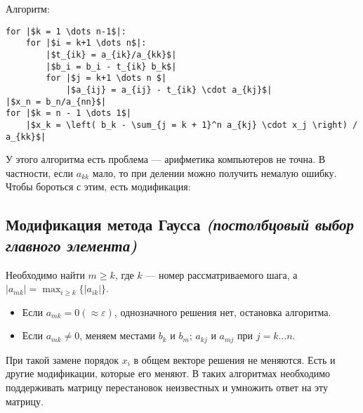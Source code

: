 Алгоритм:
\renewcommand{\theFancyVerbLine}{\sffamily \small\arabic{FancyVerbLine}}
\begin{verbatim}
for |$k = 1 \dots n-1$|:
    for |$i = k+1 \dots n$|:
        |$t_{ik} = a_{ik}/a_{kk}$|
        |$b_i = b_i - t_{ik} b_k$|
        for |$j = k+1 \dots n $|
            |$a_{ij} = a_{ij} - t_{ik} \cdot a_{kj}$|
|$x_n = b_n/a_{nn}$|
for |$k = n - 1 \dots 1$|
    |$x_k = \left( b_k - \sum_{j = k + 1}^n a_{kj} \cdot x_j \right) / a_{kk}$|
\end{verbatim}

У этого алгоритма есть проблема --- арифметика компьютеров не точна. В частности, если \(a_{kk}\) мало, то при делении можно получить немалую ошибку. Чтобы бороться с этим, есть модификация:

\subsection{Модификация метода Гаусса \textit{(постолбцовый выбор главного элемента)}}

Необходимо найти \(m \geq k\), где \(k\) --- номер рассматриваемого шага, а \(|a_{mk}| = \max_{i \geq k} \{|a_{ik}|\} \).

\begin{itemize}
    \item Если \(a_{mk} = 0 (\approx \varepsilon)\), однозначного решения нет, остановка алгоритма.
    \item Если \(a_{mk} \neq 0\), меняем местами \(b_k\) и \(b_m\); \(a_{kj}\) и \(a_{mj}\) при \(j = k \dots n\).
\end{itemize}

При такой замене порядок \(x_i\) в общем векторе решения не меняются. Есть и другие модификации, которые его меняют. В таких алгоритмах необходимо поддерживать матрицу перестановок неизвестных и умножить ответ на эту матрицу.
